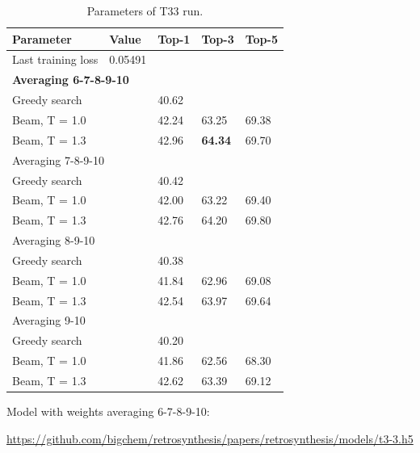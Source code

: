 \documentclass{article}
\begin{document}
\begin{table}[h!]
\caption{Parameters of T33 run.}
  \centering
  \begin{tabular}{p{8.2cm}p{1.5cm}p{1.5cm}p{1.5cm}p{1.5cm}}
    \toprule
    Parameter & Value & Top-1 & Top-3 & Top-5 \\
    \midrule
    Last training loss & 0.05491 & & & \\
    \midrule
    \multicolumn{5}{l}{\textbf{Averaging 6-7-8-9-10}} \\ \midrule
    Greedy search  & & 40.62 & & \\
    Beam, T = 1.0  & & 42.24 & 63.25 & 69.38  \\
    Beam, T = 1.3 & & 42.96 & \textbf{64.34} & 69.70 \\ 
    \midrule
    \multicolumn{5}{l}{Averaging 7-8-9-10} \\ \midrule
    Greedy search  & & 40.42 & & \\
    Beam, T = 1.0  & & 42.00 & 63.22 & 69.40  \\
    Beam, T = 1.3 & & 42.76 & 64.20 & 69.80 \\ \midrule
    \multicolumn{5}{l}{Averaging 8-9-10} \\ \midrule
    Greedy search  & & 40.38 & & \\
    Beam, T = 1.0  & & 41.84 & 62.96 & 69.08  \\
    Beam, T = 1.3 & & 42.54 & 63.97 & 69.64 \\ \midrule
    \multicolumn{5}{l}{Averaging 9-10} \\ \midrule
    Greedy search  & & 40.20 & & \\
    Beam, T = 1.0  & & 41.86 & 62.56 & 68.30  \\
    Beam, T = 1.3 & & 42.62 & 63.39 & 69.12 \\ 
    \bottomrule
  \end{tabular}
  \label{tbl:t33}
\end{table} 

Model with weights averaging 6-7-8-9-10:

\url{https://github.com/bigchem/retrosynthesis/papers/retrosynthesis/models/t3-3.h5}
\end{document}
